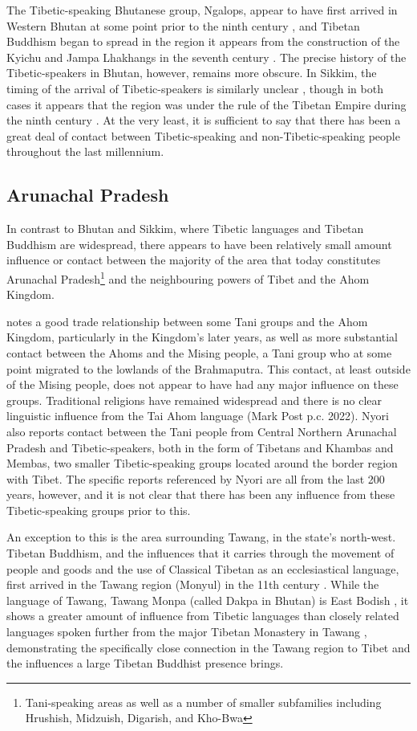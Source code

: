 The Tibetic-speaking Bhutanese group, Ngalops, appear to have first arrived in Western Bhutan at some point prior to the ninth century \cite{VanDriem2001b}, and Tibetan Buddhism began to spread in the region it appears from the construction of the Kyichu and Jampa Lhakhangs in the seventh century \cite{Phuntsho2014}. The precise history of the Tibetic-speakers in Bhutan, however, remains more obscure. In Sikkim, the timing of the arrival of Tibetic-speakers is similarly unclear \cites{Spengen2010}{Yliniemi2021}, though in both cases it appears that the region was under the rule of the Tibetan Empire during the ninth century \cite{Schaik2013}. At the very least, it is sufficient to say that there has been a great deal of contact between Tibetic-speaking and non-Tibetic-speaking people throughout the last millennium.

\subsection{Arunachal Pradesh}\label{ss:History:Arunachal}
In contrast to Bhutan and Sikkim, where Tibetic languages and Tibetan Buddhism are widespread, there appears to have been relatively small amount influence or contact between the majority of the area that today constitutes Arunachal Pradesh\footnote{Tani-speaking areas as well as a number of smaller subfamilies including Hrushish, Midzuish, Digarish, and Kho-Bwa} and the neighbouring powers of Tibet and the Ahom Kingdom. 

 notes a good trade relationship between some Tani groups and the Ahom Kingdom, particularly in the Kingdom's later years, as well as more substantial contact between the Ahoms and the Mising people, a Tani group who at some point migrated to the lowlands of the Brahmaputra. This contact, at least outside of the Mising people, does not appear to have had any major influence on these groups. Traditional religions have remained widespread and there is no clear linguistic influence from the Tai Ahom language (Mark Post p.c. 2022). Nyori also reports contact between the Tani people from Central Northern Arunachal Pradesh and Tibetic-speakers, both in the form of Tibetans and Khambas and Membas, two smaller Tibetic-speaking groups located around the border region with Tibet. The specific reports referenced by Nyori are all from the last 200 years, however, and it is not clear that there has been any influence from these Tibetic-speaking groups prior to this.

An exception to this is the area surrounding Tawang, in the state's north-west. Tibetan Buddhism, and the influences that it carries through the movement of people and goods and the use of Classical Tibetan as an ecclesiastical language, first arrived in the Tawang region (Monyul) in the 11th century \cite{Namgyal2020}. While the language of Tawang, Tawang Monpa (called Dakpa in Bhutan) is East Bodish \cite{Tombleson2020}, it shows a greater amount of influence from Tibetic languages than closely related languages spoken further from the major Tibetan Monastery in Tawang \cite{vanDriem2007}, demonstrating the specifically close connection in the Tawang region to Tibet and the influences a large Tibetan Buddhist presence brings.

